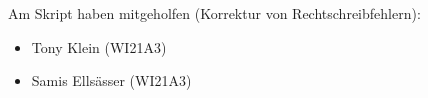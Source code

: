 Am Skript haben mitgeholfen (Korrektur von Rechtschreibfehlern):
\begin{itemize}
\item Tony Klein (WI21A3)
\item Samis Ellsässer (WI21A3)
\end{itemize}

